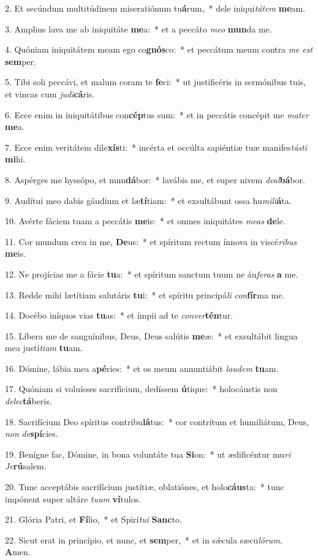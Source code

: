 2. Et secúndum multitúdinem miseratiónum tu\textbf{á}rum,~*  dele iniqui\textit{tá}\textit{tem} \textbf{me}am.\

3. Amplius lava me ab iniquitáte \textbf{me}a:~*  et a peccáto \textit{me}\textit{o} \textbf{mun}da me.\

4. Quóniam iniquitátem meam ego co\textbf{gnós}co:~*  et peccátum meum contra \textit{me} \textit{est} \textbf{sem}per.\

5. Tibi soli peccávi, et malum coram te \textbf{fe}ci:~*  ut justificéris in sermónibus tuis, et vincas cum \textit{ju}\textit{di}\textbf{cá}ris.\

6. Ecce enim in iniquitátibus con\textbf{cép}tus sum:~*  et in peccátis concépit me \textit{ma}\textit{ter} \textbf{me}a.\

7. Ecce enim veritátem dile\textbf{xís}ti:~*  incérta et occúlta sapiéntiæ tuæ manifes\textit{tás}\textit{ti} \textbf{mi}hi.\

8. Aspérges me hyssópo, et mun\textbf{dá}bor:~*  lavábis me, et super nivem \textit{de}\textit{al}\textbf{bá}bor.\

9. Audítui meo dabis gáudium et læ\textbf{tí}tiam:~*  et exsultábunt ossa hu\textit{mi}\textit{li}\textbf{á}ta.\

10. Avérte fáciem tuam a peccátis \textbf{me}is:~*  et omnes iniquitátes \textit{me}\textit{as} \textbf{de}le.\

11. Cor mundum crea in me, \textbf{De}us:~*  et spíritum rectum ínnova in viscé\textit{ri}\textit{bus} \textbf{me}is.\

12. Ne projícias me a fácie \textbf{tu}a:~*  et spíritum sanctum tuum ne áu\textit{fe}\textit{ras} \textbf{a} me.\

13. Redde mihi lætítiam salutáris \textbf{tu}i:~*  et spíritu principá\textit{li} \textit{con}\textbf{fír}ma me.\

14. Docébo iníquos vias \textbf{tu}as:~*  et ímpii ad te \textit{con}\textit{ver}\textbf{tén}tur.\

15. Líbera me de sanguínibus, Deus, Deus salútis \textbf{me}æ:~*  et exsultábit lingua mea justí\textit{ti}\textit{am} \textbf{tu}am.\

16. Dómine, lábia mea a\textbf{pé}ries:~*  et os meum annuntiábit \textit{lau}\textit{dem} \textbf{tu}am.\

17. Quóniam si voluísses sacrifícium, dedíssem \textbf{ú}tique:~*  holocáustis non \textit{de}\textit{lec}\textbf{tá}beris.\

18. Sacrifícium Deo spíritus contribu\textbf{lá}tus:~*  cor contrítum et humiliátum, Deus, \textit{non} \textit{de}\textbf{spí}cies.\

19. Benígne fac, Dómine, in bona voluntáte tua \textbf{Si}on:~*  ut ædificéntur mu\textit{ri} \textit{Je}\textbf{rú}salem.\

20. Tunc acceptábis sacrifícium justítiæ, oblatiónes, et holo\textbf{cáus}ta:~*  tunc impónent super altáre \textit{tu}\textit{um} \textbf{ví}tulos.\

21. Glória Patri, et \textbf{Fí}lio,~*  et Spirí\textit{tu}\textit{i} \textbf{Sanc}to.\

22. Sicut erat in princípio, et nunc, et \textbf{sem}per,~*  et in sǽcula sæcu\textit{ló}\textit{rum}. \textbf{A}men.\

